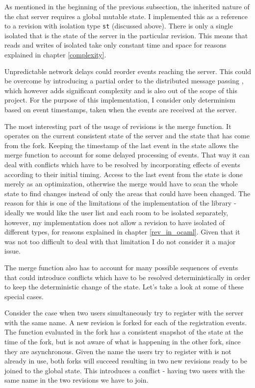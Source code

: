 \documentclass[12pt,twoside,notitlepage]{report}
\begin{document}
{As mentioned in the beginning of the previous subsection, the inherited nature of the chat server requires a global mutable state. I implemented this as a reference to a revision with isolation type {\tt st} (discussed above). There is only a single isolated that is the state of the server in the particular revision. This means that reads and writes of isolated take only constant time and space for reasons explained in chapter \ref{complexity}.

Unpredictable network delays could reorder events reaching the server. This could be overcome by introducing a partial order to the distributed message passing \cite{bacon}, which however adds significant complexity and is also out of the scope of this project. For the purpose of this implementation, I consider only determinism based on event timestamps, taken when the events are received at the server.

The most interesting part of the usage of revisions is the merge function. It operates on the current consistent state of the server and the state that has come from the fork. Keeping the timestamp of the last event in the state allows the merge function to account for some delayed processing of events. That way it can deal with conflicts which have to be resolved by incorporating effects of events according to their initial timing. Access to the last event from the state is done merely as an optimization, otherwise the merge would have to scan the whole state to find changes instead of only the areas that could have been changed. The reason for this is one of the limitations of the implementation of the library - ideally we would like the user list and each room to be isolated separately, however, my implementation does not allow a revision to have isolated of different types, for reasons explained in chapter \ref{rev_in_ocaml}. Given that it was not too difficult to deal with that limitation I do not consider it a major issue. 

The merge function also has to account for many possible sequences of events that could introduce conflicts which have to be resolved deterministically in order to keep the deterministic change of the state. Let's take a look at some of these special cases.

Consider the case when two users simultaneously try to register with the server with the same name. A new revision is forked for each of the registration events. The function evaluated in the fork has a consistent snapshot of the state at the time of the fork, but is not aware of what is happening in the other fork, since they are asynchronous. Given the name the users try to register with is not already in use, both forks will succeed resulting in two new revisions ready to be joined to the global state. This introduces a conflict - having two users with the same name in the two revisions we have to join. 

}
\end{document}

